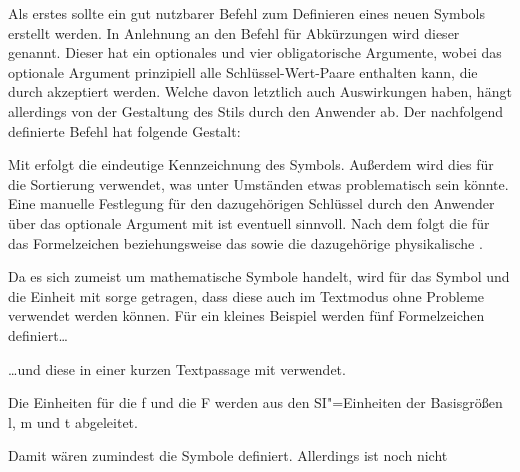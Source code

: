 \documentclass[english,ngerman]{tudscrartcl}
\begin{document}
Als erstes sollte ein gut nutzbarer Befehl zum Definieren eines neuen Symbols 
erstellt werden. In Anlehnung an den Befehl für Abkürzungen wird dieser 
 genannt. Dieser hat ein optionales und vier obligatorische 
Argumente, wobei das optionale Argument prinzipiell alle Schlüssel-Wert-Paare 
enthalten kann, die durch  akzeptiert werden. Welche davon 
letztlich auch Auswirkungen haben, hängt allerdings von der Gestaltung des 
Stils durch den Anwender ab. Der nachfolgend definierte Befehl hat folgende 
Gestalt:
%
\begin{quoting}[rightmargin=0pt]
\LParameter{}%
\end{quoting}
%
Mit  erfolgt die eindeutige Kennzeichnung des Symbols. Außerdem 
wird dies für die Sortierung verwendet, was unter Umständen etwas problematisch 
sein könnte. Eine manuelle Festlegung für den dazugehörigen Schlüssel durch den 
Anwender über das optionale Argument mit  ist 
eventuell sinnvoll. Nach dem  folgt die  für 
das Formelzeichen beziehungsweise das  sowie die dazugehörige 
physikalische .
%
\begin{Tutorial}
\newcommand*{\newsymbol}[5][]{%
  \newglossaryentry{#2}{%
    type=symbols,%
    description={},%
    name={#3},%
    symbol={\ensuremath{#4}},%
    user1={\ensuremath{\mathrm{#5}}},%
    sort={#2},%
    #1%
  }%
}
\end{Tutorial}
%
Da es sich zumeist um mathematische Symbole handelt, wird für das Symbol und 
die Einheit mit  sorge getragen, dass diese auch im 
Textmodus ohne Probleme verwendet werden können. 
Für ein kleines Beispiel werden fünf Formelzeichen definiert\dots
%
\begin{Tutorial}
\end{Tutorial}
%
\dots und diese in einer kurzen Textpassage mit  
verwendet.
%
\begin{Tutorial}
Die Einheiten für die \gls{f} und die \gls{F} werden aus den SI"=Einheiten 
der Basisgrößen \gls{l}, \gls{m} und \gls{t} abgeleitet.
\end{Tutorial}
%
Damit wären zumindest die Symbole definiert. Allerdings ist noch nicht 
\end{document}
